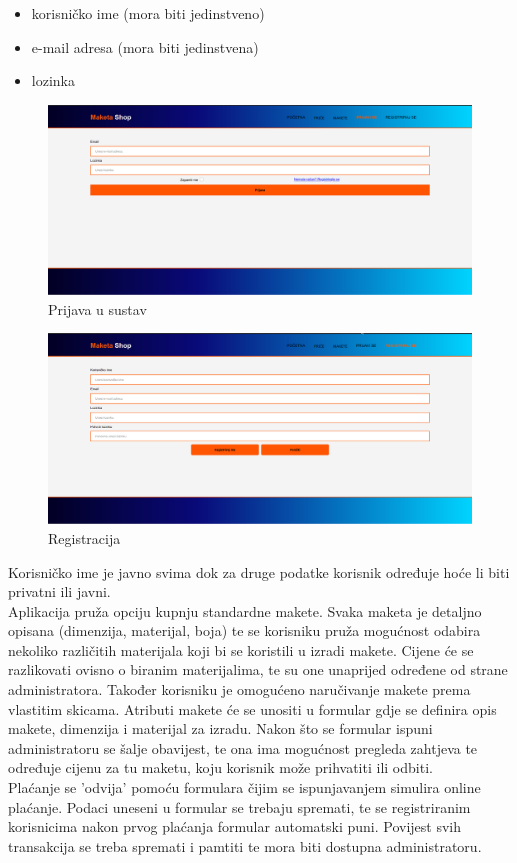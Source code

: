 		\begin{itemize}
			\item korisničko ime (mora biti jedinstveno)
			\item e-mail adresa (mora biti jedinstvena)
			\item lozinka
		\end{itemize} 	
	
		\begin{figure}[H]
			\includegraphics[width=.9\linewidth]{slike/20201112_182228.png}
			\centering
			\caption{Prijava u sustav}
			\label{fig:opis2}
		\end{figure}
	
		\begin{figure}[H]
			\includegraphics[width=.9\linewidth]{slike/20201112_182312.png}
			\centering
			\caption{Registracija}
			\label{fig:opis3}
		\end{figure}
	
		Korisničko ime je javno svima dok za druge podatke korisnik određuje hoće li biti privatni ili javni.\\
		
		Aplikacija pruža opciju kupnju standardne makete. Svaka maketa je detaljno opisana (dimenzija, materijal, boja) te se korisniku pruža mogućnost odabira nekoliko različitih materijala koji bi se koristili u izradi makete. Cijene će se razlikovati ovisno o biranim materijalima, te su one unaprijed određene od strane administratora. Također korisniku je omogućeno naručivanje makete prema vlastitim skicama. Atributi makete će se unositi u formular gdje se definira opis makete, dimenzija i materijal za izradu. Nakon što se formular ispuni administratoru se šalje obavijest, te ona ima mogućnost pregleda zahtjeva te određuje cijenu za tu maketu, koju korisnik može prihvatiti ili odbiti. \\
		Plaćanje se 'odvija' pomoću formulara čijim se ispunjavanjem simulira online plaćanje. Podaci uneseni u formular se trebaju spremati, te se registriranim korisnicima nakon prvog plaćanja formular automatski puni. Povijest svih transakcija se treba spremati i pamtiti te mora biti dostupna administratoru. \\
		
